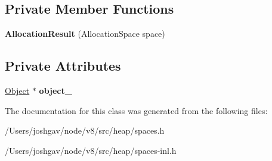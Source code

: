 \subsection*{Private Member Functions}
\begin{DoxyCompactItemize}
\item 
{\bfseries Allocation\+Result} (Allocation\+Space space)\hypertarget{classv8_1_1internal_1_1_allocation_result_aed72dcbbf9c83eec64918f3773c16d97}{}\label{classv8_1_1internal_1_1_allocation_result_aed72dcbbf9c83eec64918f3773c16d97}

\end{DoxyCompactItemize}
\subsection*{Private Attributes}
\begin{DoxyCompactItemize}
\item 
\hyperlink{classv8_1_1internal_1_1_object}{Object} $\ast$ {\bfseries object\+\_\+}\hypertarget{classv8_1_1internal_1_1_allocation_result_a97c6fd4f49b3e18efd87ce17b24f9bc1}{}\label{classv8_1_1internal_1_1_allocation_result_a97c6fd4f49b3e18efd87ce17b24f9bc1}

\end{DoxyCompactItemize}


The documentation for this class was generated from the following files\+:\begin{DoxyCompactItemize}
\item 
/\+Users/joshgav/node/v8/src/heap/spaces.\+h\item 
/\+Users/joshgav/node/v8/src/heap/spaces-\/inl.\+h\end{DoxyCompactItemize}
